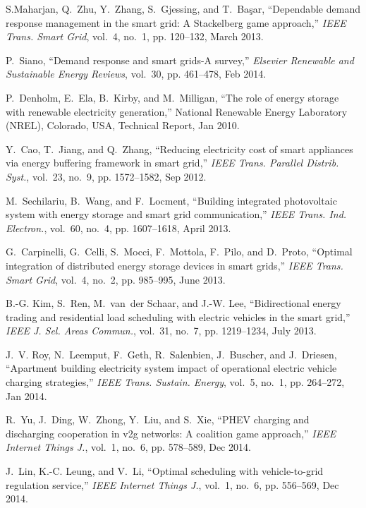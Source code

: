 \documentclass[journal,10pt]{IEEEtran}
\begin{document}
\begin{thebibliography}{10}
S.Maharjan, Q.~Zhu, Y.~Zhang, S.~Gjessing, and T.~Ba{\c{s}}ar, ``Dependable
  demand response management in the smart grid: {A} {S}tackelberg game
  approach,'' \emph{IEEE Trans. Smart Grid}, vol.~4, no.~1, pp. 120--132, March
  2013.

P.~Siano, ``Demand response and smart grids-{A} survey,'' \emph{Elsevier
  Renewable and Sustainable Energy Reviews}, vol.~30, pp. 461--478, Feb 2014.

P.~Denholm, E.~Ela, B.~Kirby, and M.~Milligan, ``The role of energy storage
  with renewable electricity generation,'' National Renewable Energy Laboratory
  (NREL), Colorado, USA, Technical Report, Jan 2010.

Y.~Cao, T.~Jiang, and Q.~Zhang, ``Reducing electricity cost of smart appliances
  via energy buffering framework in smart grid,'' \emph{IEEE Trans. Parallel
  Distrib. Syst.}, vol.~23, no.~9, pp. 1572--1582, Sep 2012.

M.~Sechilariu, B.~Wang, and F.~Locment, ``Building integrated photovoltaic
  system with energy storage and smart grid communication,'' \emph{IEEE Trans.
  Ind. Electron.}, vol.~60, no.~4, pp. 1607--1618, April 2013.

G.~Carpinelli, G.~Celli, S.~Mocci, F.~Mottola, F.~Pilo, and D.~Proto, ``Optimal
  integration of distributed energy storage devices in smart grids,''
  \emph{IEEE Trans. Smart Grid}, vol.~4, no.~2, pp. 985--995, June 2013.

B.-G. Kim, S.~Ren, M.~van~der Schaar, and J.-W. Lee, ``Bidirectional energy
  trading and residential load scheduling with electric vehicles in the smart
  grid,'' \emph{IEEE J. Sel. Areas Commun.}, vol.~31, no.~7, pp. 1219--1234,
  July 2013.

J.~V. Roy, N.~Leemput, F.~Geth, R.~Salenbien, J.~Buscher, and J.~Driesen,
  ``Apartment building electricity system impact of operational electric
  vehicle charging strategies,'' \emph{IEEE Trans. Sustain. Energy}, vol.~5,
  no.~1, pp. 264--272, Jan 2014.

R.~Yu, J.~Ding, W.~Zhong, Y.~Liu, and S.~Xie, ``{PHEV} charging and discharging
  cooperation in v2g networks: A coalition game approach,'' \emph{IEEE Internet
  Things J.}, vol.~1, no.~6, pp. 578--589, Dec 2014.

J.~Lin, K.-C. Leung, and V.~Li, ``Optimal scheduling with vehicle-to-grid
  regulation service,'' \emph{IEEE Internet Things J.}, vol.~1, no.~6, pp.
  556--569, Dec 2014.


\end{thebibliography}
\end{document}
